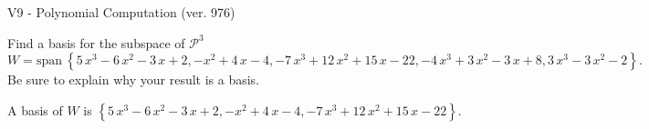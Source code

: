\begin{exercise}
  \begin{exerciseTitle}V9 - Polynomial Computation (ver. 976)\end{exerciseTitle}
  \begin{exerciseStatement}
    Find a basis for the subspace of \(\mathcal{P}^3\) 
\[W=\mathrm{span}\ \left\{5 \, x^{3} - 6 \, x^{2} - 3 \, x + 2 , -x^{2} + 4 \, x - 4 , -7 \, x^{3} + 12 \, x^{2} + 15 \, x - 22 , -4 \, x^{3} + 3 \, x^{2} - 3 \, x + 8 , 3 \, x^{3} - 3 \, x^{2} - 2\right\}.\]
 Be sure to explain why your result is a basis.


  \end{exerciseStatement}
  \begin{exerciseAnswer}
   A basis of \(W\) is  \(\left\{5 \, x^{3} - 6 \, x^{2} - 3 \, x + 2 , -x^{2} + 4 \, x - 4 , -7 \, x^{3} + 12 \, x^{2} + 15 \, x - 22\right\}\).
  


  \end{exerciseAnswer}
\end{exercise}